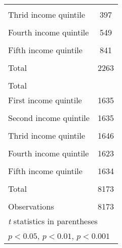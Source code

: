{\begin{tabular}{l*{1}{c}}
                    &                     \\
\addlinespace
Thrid income quintile&         397         \\
                    &                     \\
\addlinespace
Fourth income quintile&         549         \\
                    &                     \\
\addlinespace
Fifth income quintile&         841         \\
                    &                     \\
\addlinespace
Total               &        2263         \\
                    &                     \\
\midrule
Total               &                     \\
First income quintile&        1635         \\
                    &                     \\
\addlinespace
Second income quintile&        1635         \\
                    &                     \\
\addlinespace
Thrid income quintile&        1646         \\
                    &                     \\
\addlinespace
Fourth income quintile&        1623         \\
                    &                     \\
\addlinespace
Fifth income quintile&        1634         \\
                    &                     \\
\addlinespace
Total               &        8173         \\
                    &                     \\
\midrule
Observations        &        8173         \\
\bottomrule
\multicolumn{2}{l}{\footnotesize \textit{t} statistics in parentheses}\\
\multicolumn{2}{l}{\footnotesize \sym{*} \(p<0.05\), \sym{**} \(p<0.01\), \sym{***} \(p<0.001\)}\\
\end{tabular}
}
